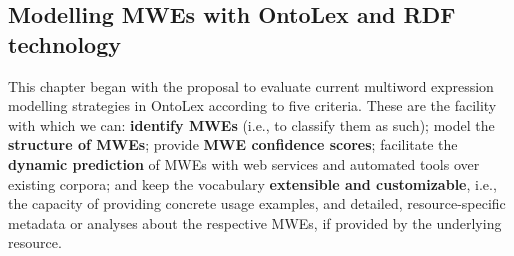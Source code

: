 \documentclass[output=paper,colorlinks,citecolor=brown]{langscibook}
\begin{document}
\subsection{Modelling MWEs with OntoLex and RDF technology} %
\label{ssec-eval-ontolex-criteria}
This chapter began with the proposal to evaluate current multiword expression modelling strategies in OntoLex according to five criteria. These are the facility with which we can:
{\bfseries identify MWEs} (i.e., to classify them as such); %
model the {\bfseries structure of MWEs}; %
provide {\bfseries MWE confidence scores}; %
facilitate the {\bfseries dynamic prediction} of MWEs with web services and automated tools over existing corpora; and
keep the vocabulary {\bfseries extensible and customizable}, i.e., the capacity of providing concrete usage examples, and detailed, resource-specific metadata or analyses about the respective MWEs, if provided by the underlying resource.

\begin{table}
\caption{Modelling MWEs with OntoLex. “(+)” indicates partial compatibility.}
\label{tab-comparison}
\end{table}
\end{document}
